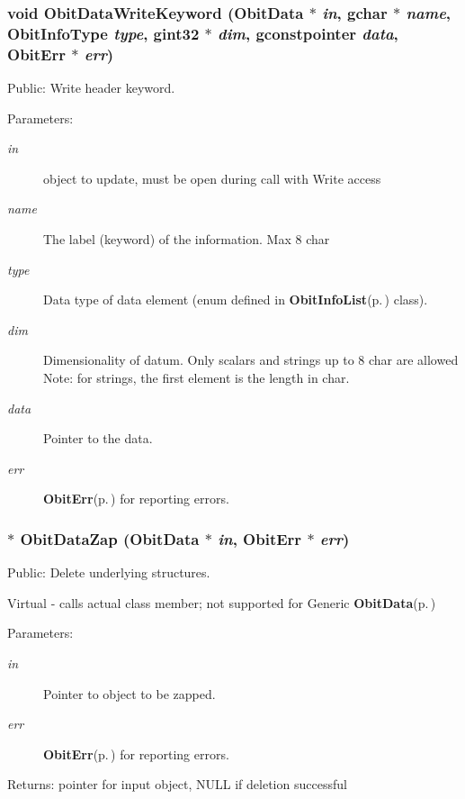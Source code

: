 \subsubsection{\setlength{\rightskip}{0pt plus 5cm}void Obit\-Data\-Write\-Keyword ({\bf Obit\-Data} $\ast$ {\em in}, gchar $\ast$ {\em name}, Obit\-Info\-Type {\em type}, gint32 $\ast$ {\em dim}, gconstpointer {\em data}, {\bf Obit\-Err} $\ast$ {\em err})}\label{ObitData_8h_a47}


Public: Write header keyword. 

\begin{Desc}
\item[Parameters:]
\begin{description}
\item[{\em in}]object to update, must be open during call with Write access \item[{\em name}]The label (keyword) of the information. Max 8 char \item[{\em type}]Data type of data element (enum defined in {\bf Obit\-Info\-List}{\rm (p.\,\pageref{structObitInfoList})} class). \item[{\em dim}]Dimensionality of datum. Only scalars and strings up to 8 char are allowed Note: for strings, the first element is the length in char. \item[{\em data}]Pointer to the data. \item[{\em err}]{\bf Obit\-Err}{\rm (p.\,\pageref{structObitErr})} for reporting errors. \end{description}
\end{Desc}
\subsubsection{$\ast$ Obit\-Data\-Zap ({\bf Obit\-Data} $\ast$ {\em in}, {\bf Obit\-Err} $\ast$ {\em err})}\label{ObitData_8h_a33}


Public: Delete underlying structures. 

Virtual - calls actual class member; not supported for Generic {\bf Obit\-Data}{\rm (p.\,\pageref{structObitData})} \begin{Desc}
\item[Parameters:]
\begin{description}
\item[{\em in}]Pointer to object to be zapped. \item[{\em err}]{\bf Obit\-Err}{\rm (p.\,\pageref{structObitErr})} for reporting errors. \end{description}
\end{Desc}
\begin{Desc}
\item[Returns:]pointer for input object, NULL if deletion successful \end{Desc}
